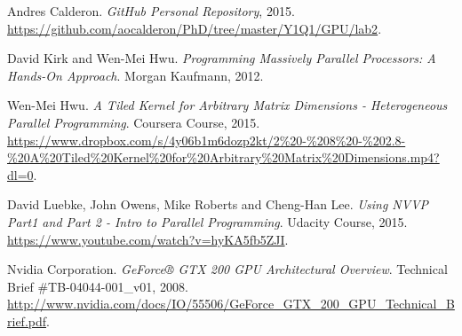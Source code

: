 \documentclass[a4paper,10pt]{scrartcl}
\begin{document}
\begin{thebibliography}{9}
Andres Calderon.
\textit{GitHub Personal Repository}, 2015. 
\url{https://github.com/aocalderon/PhD/tree/master/Y1Q1/GPU/lab2}.
 
David Kirk and Wen-Mei Hwu.
\textit{Programming Massively Parallel Processors: A Hands-On Approach}. 
Morgan Kaufmann, 2012.

Wen-Mei Hwu.
\textit{A Tiled Kernel for Arbitrary Matrix Dimensions - Heterogeneous Parallel Programming}. 
Coursera Course, 2015. \url{https://www.dropbox.com/s/4y06b1m6dozp2kt/2%20-%208%20-%202.8-%20A%20Tiled%20Kernel%20for%20Arbitrary%20Matrix%20Dimensions.mp4?dl=0}.

David Luebke, John Owens, Mike Roberts and Cheng-Han Lee.
\textit{Using NVVP Part1 and Part 2 - Intro to Parallel Programming}. 
Udacity Course, 2015. \url{https://www.youtube.com/watch?v=hyKA5fb5ZJI}.

Nvidia Corporation.
\textit{GeForce® GTX 200 GPU Architectural Overview}. Technical Brief \#TB-04044-001\_v01, 2008. 
\url{http://www.nvidia.com/docs/IO/55506/GeForce_GTX_200_GPU_Technical_Brief.pdf}.
\end{thebibliography}
\end{document}

